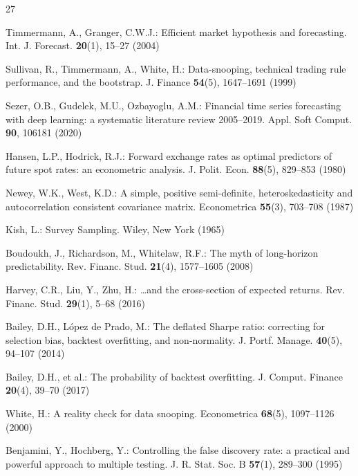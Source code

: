 \documentclass[runningheads]{llncs}
\begin{document}
\scriptsize
\begin{thebibliography}{27}

\setlength{\itemsep}{0pt}
\setlength{\parskip}{0pt}
\setlength{\parsep}{0pt}

Timmermann, A., Granger, C.W.J.: Efficient market hypothesis and forecasting.
Int. J. Forecast. \textbf{20}(1), 15--27 (2004)

Sullivan, R., Timmermann, A., White, H.: Data-snooping, technical trading rule
performance, and the bootstrap. J. Finance \textbf{54}(5), 1647--1691 (1999)

Sezer, O.B., Gudelek, M.U., Ozbayoglu, A.M.: Financial time series forecasting
with deep learning: a systematic literature review 2005--2019. Appl. Soft
Comput. \textbf{90}, 106181 (2020)

Hansen, L.P., Hodrick, R.J.: Forward exchange rates as optimal predictors of
future spot rates: an econometric analysis. J. Polit. Econ. \textbf{88}(5),
829--853 (1980)

Newey, W.K., West, K.D.: A simple, positive semi-definite, heteroskedasticity
and autocorrelation consistent covariance matrix. Econometrica \textbf{55}(3),
703--708 (1987)

Kish, L.: Survey Sampling. Wiley, New York (1965)

Boudoukh, J., Richardson, M., Whitelaw, R.F.: The myth of long-horizon
predictability. Rev. Financ. Stud. \textbf{21}(4), 1577--1605 (2008)

Harvey, C.R., Liu, Y., Zhu, H.: \ldots and the cross-section of expected
returns. Rev. Financ. Stud. \textbf{29}(1), 5--68 (2016)

Bailey, D.H., L\'opez de Prado, M.: The deflated Sharpe ratio: correcting for
selection bias, backtest overfitting, and non-normality. J. Portf. Manage.
\textbf{40}(5), 94--107 (2014)

Bailey, D.H., et al.: The probability of
backtest overfitting. J. Comput. Finance \textbf{20}(4), 39--70 (2017)

White, H.: A reality check for data snooping. Econometrica \textbf{68}(5),
1097--1126 (2000)

Benjamini, Y., Hochberg, Y.: Controlling the false discovery rate: a practical
and powerful approach to multiple testing. J. R. Stat. Soc. B \textbf{57}(1),
289--300 (1995)


\end{thebibliography}
\end{document}
